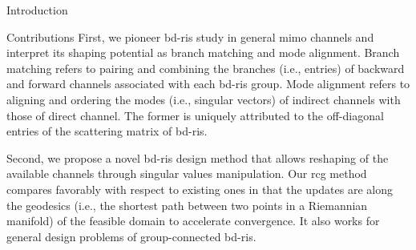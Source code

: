 \begin{section}{Introduction}
\begin{subsection}{Contributions}
		First, we pioneer \gls{bd}-\gls{ris} study in general \gls{mimo} channels and interpret its shaping potential as branch matching and mode alignment.
		Branch matching refers to pairing and combining the branches (i.e., entries) of backward and forward channels associated with each \gls{bd}-\gls{ris} group.
		Mode alignment refers to aligning and ordering the modes (i.e., singular vectors) of indirect channels with those of direct channel.
		The former is uniquely attributed to the off-diagonal entries of the scattering matrix of \gls{bd}-\gls{ris}.



		Second, we propose a novel \gls{bd}-\gls{ris} design method that allows reshaping of the available channels through singular values manipulation.
		Our \gls{rcg} method compares favorably with respect to existing ones in that the updates are along the geodesics (i.e., the shortest path between two points in a Riemannian manifold) of the feasible domain to accelerate convergence.
		It also works for general design problems of group-connected \gls{bd}-\gls{ris}.




\end{subsection}
\end{section}
